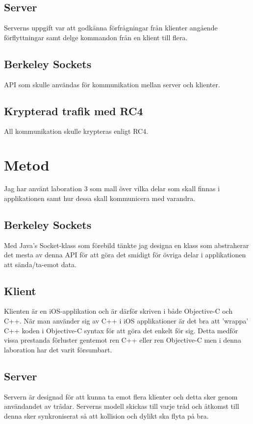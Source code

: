 \documentclass[10pt, titlepage, oneside, a4paper]{article}
\begin{document}
		\subsection{Server}
		Serverns uppgift var att godkänna förfrågningar från klienter angående förflyttningar samt delge kommandon från en klient till flera.
		
		\subsection{Berkeley Sockets}
		API som skulle användas för kommunikation mellan server och klienter.

		\subsection{Krypterad trafik med RC4}
		All kommunikation skulle krypteras enligt RC4.

	\newpage	
	\section{Metod}%
	Jag har använt laboration 3 som mall över vilka delar som skall finnas i applikationen samt hur dessa skall kommunicera med varandra. 
	
		\subsection{Berkeley Sockets}	
		Med Java's Socket-klass som förebild tänkte jag designa en klass som abstraherar det mesta av denna API för att göra det smidigt för övriga delar i applikationen att sända/ta-emot data. 
		
		\subsection{Klient} %
		Klienten är en iOS-applikation och är därför skriven i både Objective-C och C++. När man använder sig av C++ i iOS applikationer är det bra att 'wrappa' C++ koden i Objective-C syntax för att göra det enkelt för sig. Detta medför vissa prestanda förluster gentemot ren C++ eller ren Objective-C men i denna laboration har det varit försumbart.
		
		\subsection{Server} %
		Servern är designad för att kunna ta emot flera klienter och detta sker genom användandet av trådar. Serverns modell skickas till varje tråd och åtkomst till denna sker synkroniserat så att kollision och dylikt ska flyta på bra.
				
\end{document}
